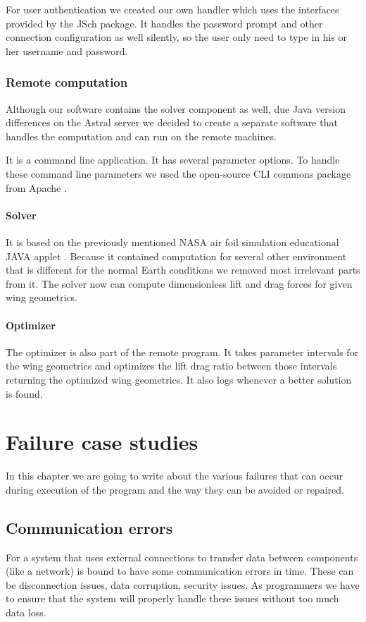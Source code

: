 \documentclass[10pt,a4paper]{report}
\begin{document}
For user authentication we created our own handler which uses the interfaces provided by the JSch package. It handles the password prompt and other connection configuration as well silently, so the user only need to type in his or her username and password.

\subsection{Remote computation}
Although our software contains the solver component as well, due Java version differences on the Astral server we decided to create a separate software that handles the computation and can run on the remote machines.

It is a command line application. It has several parameter options. To handle these command line parameters we used the open-source CLI commons package from Apache \cite{WWW:CLI}.

\subsubsection{Solver}
It is based on the previously mentioned NASA air foil simulation educational JAVA applet \cite{WWW:NASA}. Because it contained computation for several other environment that is different for the normal Earth conditions we removed most irrelevant parts from it. The solver now can compute dimensionless lift and drag forces for given wing geometrics.

\subsubsection{Optimizer}
The optimizer is also part of the remote program. It takes parameter intervals for the wing geometrics and optimizes the lift drag ratio between those intervals returning the optimized wing geometrics. It also logs whenever a better solution is found.

\chapter{Failure case studies}
In this chapter we are going to write about the various failures that can occur during execution of the program and the way they can be avoided or repaired.

\section{Communication errors}
For a system that uses external connections to transfer data between components (like a network) is bound to have some communication errors in time. These can be disconnection issues, data corruption, security issues. As programmers we have to ensure that the system will properly handle these issues without too much data loss.
\end{document}

